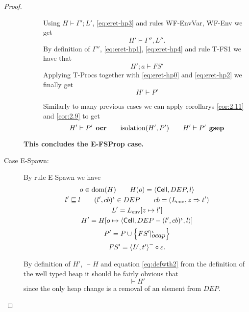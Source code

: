 \begin{proof}
\begin{description}
\begin{description}
          Using $H \vdash \Gamma'; L'$, \eqref{eq:eret-hp3} and rules {\sc WF-EnvVar}, {\sc
          WF-Env} we get
          \begin{equation} \label{eq:eret-hp4}
            H' \vdash \Gamma'', L''.
          \end{equation}
          By definition of $\Gamma''$, \eqref{eq:eret-hp1}, \eqref{eq:eret-hp4}
          and rule {\sc T-FS1} we have that
          \begin{equation} \label{eq:eret-hp2}
            H';a \vdash FS'
          \end{equation}
          Applying {\sc T-Procs} together with \eqref{eq:eret-hp0} and
          \eqref{eq:eret-hp2} we finally get
          \begin{equation}
            H' \vdash P'
          \end{equation}

          Similarly to many previous cases we can apply corollarys
          \ref{cor:2.11} and \ref{cor:2.9} to get
          \begin{equation*}
            H' \vdash P' \:\: \mbox{\bf ocr} \quad\quad \mbox{$\mathrm{isolation}$}(H', P') \quad\quad H'
            \vdash P' \:\: \mbox{\bf gsep}
          \end{equation*}
      \end{description}
      {\bf This concludes the {\sc E-FSProp} case.}
      
    \item[Case {\sc E-Spawn}:] By rule {\sc E-Spawn} we have
      \begin{equation}
        \begin{gathered} \label{eq:espawn1}
          o \in \mbox{$\mathrm{dom}$}(H) \quad\quad H(o) = \mbox{$\langle \mbox{$\mathsf{Cell}$}{}, DEP, l \rangle$} \\
          l' \sqsubseteq l \quad\quad (l', cb)^\iota \in DEP \quad\quad cb =
          (L_{\text{env}}, z \Rightarrow t') \\
          L' = L_{\text{env}}[z \mapsto l'] \\
          H' = H[o \mapsto \mbox{$\langle \mbox{$\mathsf{Cell}$}{}, DEP - (l', cb)^\iota, l \rangle$}] \\
          P' = P \cup \left\{ FS'|_{\mbox{$ocap$}}^\iota \right\} \\
          FS' = \mbox{$\langle L', t' \rangle$}^- \circ \varepsilon.
        \end{gathered}
      \end{equation}
      
      By definition of $H'$, $\vdash H$ and equation \eqref{eq:defwth2} from the
      definition of the well typed heap it should be fairly obvious that
      \begin{equation}
        \vdash H'
      \end{equation}
      since the only heap change is a removal of an element from $DEP$. 



\end{description}
\end{proof}
